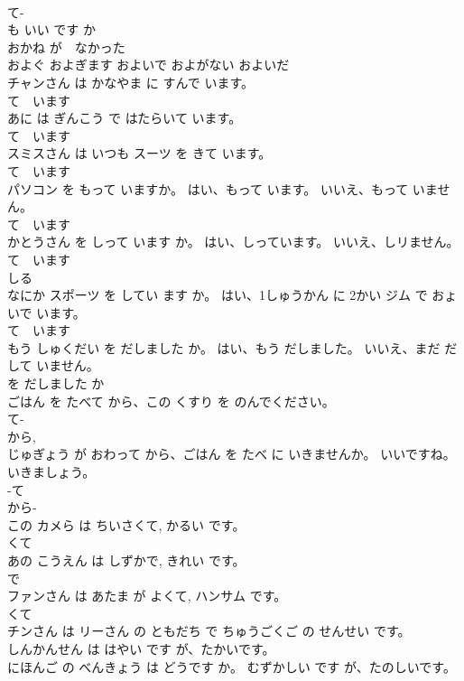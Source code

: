 \documentclass[8pt]{extreport}
\begin{document}
\begin{CJK}{UTF8}{min}
\\	て-
\\	も いい です か 
\\	おかね が　なかった	
\\	およぐ	およぎます	およいで	およがない	およいだ	
\\	チャンさん は かなやま に すんで います。	
\\	て　います 
\\	あに は ぎんこう で はたらいて います。	
\\	て　います 
\\	スミスさん は いつも スーツ を きて います。	
\\	て　います 
\\	パソコン を もって いますか。 はい、もって います。 いいえ、もって いません。	
\\	て　います 
\\	かとうさん を しって います か。 はい、しっています。 いいえ、しリません。	
\\	て　います 
\\	しる 
\\	なにか スポーツ を してい ます か。 はい、1しゅうかん に 2かい ジム で おょいで います。	
\\	て　います 
\\	もう しゅくだい を だしました か。 はい、もう だしました。 いいえ、まだ だして いません。	
\\	を だしました か 
\\	ごはん を たべて から、この くすり を のんでください。	
\\	て-
\\	から, 
\\	じゅぎょう が おわって から、ごはん を たべ に いきませんか。 いいですね。いきましょう。	
\\	-て 
\\	から- 
\\	この カメら は ちいさくて, かるい です。	
\\	くて 
\\	あの こうえん は しずかで, きれい です。	
\\	で 
\\	ファンさん は あたま が よくて, ハンサム です。	
\\	くて 
\\	チンさん は リーさん の ともだち で ちゅうごくご の せんせい です。	
\\	しんかんせん は はやい です が、たかいです。	
\\	にほんご の べんきょう は どうです か。 むずかしい です が、たのしいです。	

\end{CJK}
\end{document}
